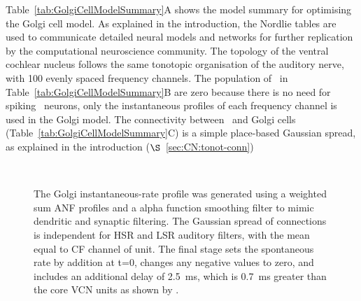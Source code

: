
Table~\ref{tab:GolgiCellModelSummary}A shows the model summary for optimising the Golgi cell model.
As explained in the introduction, the Nordlie tables are used to communicate detailed neural models and networks for further replication by the computational neuroscience community.
The topology of the ventral cochlear nucleus follows the same tonotopic organisation of the auditory nerve, with 100 evenly spaced frequency channels.
The population of \ANFs~in Table~\ref{tab:GolgiCellModelSummary}B are zero because there is no need for spiking \ANF~neurons, only the instantaneous profiles of each frequency channel is used in the Golgi model.
 The connectivity between \ANFs~and Golgi cells (Table~\ref{tab:GolgiCellModelSummary}C) is a simple place-based Gaussian spread, as explained in the introduction ($\S$~\ref{sec:CN:tonot-conn})

% 


\begin{figure}[htb]
  \centering
  \resizebox{0.9\textwidth}{!}{}\\
  \caption[Golgi cell model diagram]{The Golgi instantaneous-rate profile was generated using a weighted sum ANF profiles and a alpha function smoothing filter to mimic dendritic and synaptic filtering.
The Gaussian spread of connections is independent for HSR and LSR auditory filters, with the mean equal to CF channel of unit.
The final stage sets the spontaneous rate by addition at t=0, changes any negative values to zero, and includes an additional delay of 2.5~ms, which is 0.7~ms greater than the core VCN units as shown by \citet{GhoshalKim:1997}.}
  \label{fig:GolgiDiagram}
 \end{figure}


